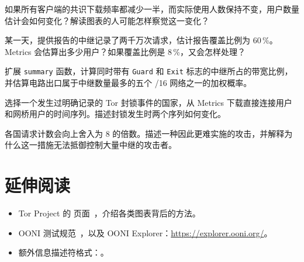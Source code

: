 \begin{esercizio}[1]\label{es:24-dieci}
如果所有客户端的共识下载频率都减少一半，而实际使用人数保持不变，用户数量估计会如何变化？解读图表的人可能怎样察觉这一变化？
\end{esercizio}

\begin{esercizio}[1]\label{es:24-frazione}
某一天，提供报告的中继记录了两千万次请求，估计报告覆盖比例为 60\,\%。Metrics 会估算出多少用户？如果覆盖比例是 8\,\%，又会怎样处理？
\end{esercizio}

\begin{esercizio}[2]\label{es:24-flag}
扩展 \texttt{summary} 函数，计算同时带有 \texttt{Guard} 和 \texttt{Exit} 标志的中继所占的带宽比例，并估算电路出口属于中继数量最多的五个 /16 网络之一的加权概率。
\end{esercizio}

\begin{esercizio}[2]\label{es:24-censura}
选择一个发生过明确记录的 Tor 封锁事件的国家，从 Metrics 下载直接连接用户和网桥用户的时间序列。描述封锁发生时两个序列如何变化。
\end{esercizio}

\begin{esercizio}[3]\label{es:24-privacy}
各国请求计数会向上舍入为 8 的倍数。描述一种因此更难实施的攻击，并解释为什么这一措施无法抵御控制大量中继的攻击者。
\end{esercizio}

\section*{延伸阅读}
\begin{itemize}
  \item Tor Project 的  页面~\cite{metricsreproducible}，介绍各类图表背后的方法。
  \item OONI 测试规范~\cite{oonitor}，以及 OONI Explorer：\url{https://explorer.ooni.org/}。
  \item 额外信息描述符格式：。
\end{itemize}
